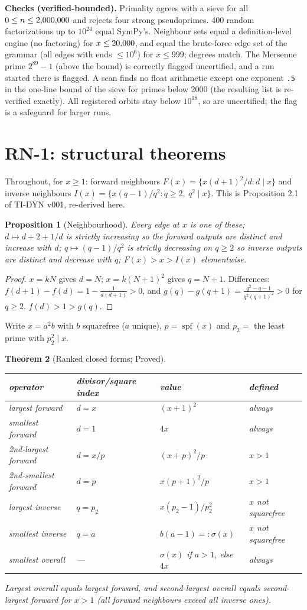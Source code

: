 \documentclass[11pt]{article}
\newtheorem{theorem}{Theorem}\newtheorem{proposition}[theorem]{Proposition}\newtheorem{lemma}[theorem]{Lemma}\newtheorem{corollary}[theorem]{Corollary}
\theoremstyle{remark}\newtheorem{remark}[theorem]{Remark}
\newcommand{\spf}{\operatorname{spf}}
\begin{document}
\textbf{Checks (verified-bounded).} Primality agrees with a sieve for all $0\le n\le2{,}000{,}000$ and rejects four strong pseudoprimes. 400 random factorizations up to $10^{24}$ equal SymPy's. Neighbour sets equal a definition-level engine (no factoring) for $x\le20{,}000$, and equal the brute-force edge set of the grammar (all edges with ends $\le10^6$) for $x\le999$; degrees match. The Mersenne prime $2^{89}-1$ (above the bound) is correctly flagged uncertified, and a run started there is flagged. A scan finds no float arithmetic except one exponent \texttt{.5} in the one-line bound of the sieve for primes below 2000 (the resulting list is re-verified exactly). All \Orbits{} registered orbits stay below $10^{18}$, so \Uncert{} are uncertified; the flag is a safeguard for larger runs.

\section{RN-1: structural theorems}
Throughout, for $x\ge1$: forward neighbours $F(x)=\{x(d+1)^2/d:d\mid x\}$ and inverse neighbours $I(x)=\{x(q-1)/q^2:q\ge2,\ q^2\mid x\}$. This is Proposition 2.1 of TI-DYN v001, re-derived here.
\begin{proposition}[Neighbourhood]\label{prop:nb}
Every edge at $x$ is one of these; $d\mapsto d+2+1/d$ is strictly increasing so the forward outputs are distinct and increase with $d$; $q\mapsto(q-1)/q^2$ is strictly decreasing on $q\ge2$ so inverse outputs are distinct and decrease with $q$; $F(x)>x>I(x)$ elementwise.
\end{proposition}
\begin{proof}$x=kN$ gives $d=N$; $x=k(N+1)^2$ gives $q=N+1$. Differences: $f(d{+}1)-f(d)=1-\frac1{d(d+1)}>0$, and $g(q)-g(q{+}1)=\frac{q^2-q-1}{q^2(q+1)^2}>0$ for $q\ge2$. $f(d)>1>g(q)$.\end{proof}
Write $x=a^2b$ with $b$ squarefree ($a$ unique), $p=\spf(x)$ and $p_2=$ the least prime with $p_2^2\mid x$.
\begin{theorem}[Ranked closed forms; Proved]\label{thm:rank}
\begin{center}\small\begin{tabular}{llll}\toprule
operator & divisor/square index & value & defined\\\midrule
largest forward & $d=x$ & $(x+1)^2$ & always\\
smallest forward & $d=1$ & $4x$ & always\\
2nd-largest forward & $d=x/p$ & $(x+p)^2/p$ & $x>1$\\
2nd-smallest forward & $d=p$ & $x(p+1)^2/p$ & $x>1$\\
largest inverse & $q=p_2$ & $x(p_2-1)/p_2^2$ & $x$ not squarefree\\
smallest inverse & $q=a$ & $b(a-1)=:\sigma(x)$ & $x$ not squarefree\\
smallest overall & --- & $\sigma(x)$ if $a>1$, else $4x$ & always\\\bottomrule\end{tabular}\end{center}
Largest overall equals largest forward, and second-largest overall equals second-largest forward for $x>1$ (all forward neighbours exceed all inverse ones).
\end{theorem}
\end{document}
